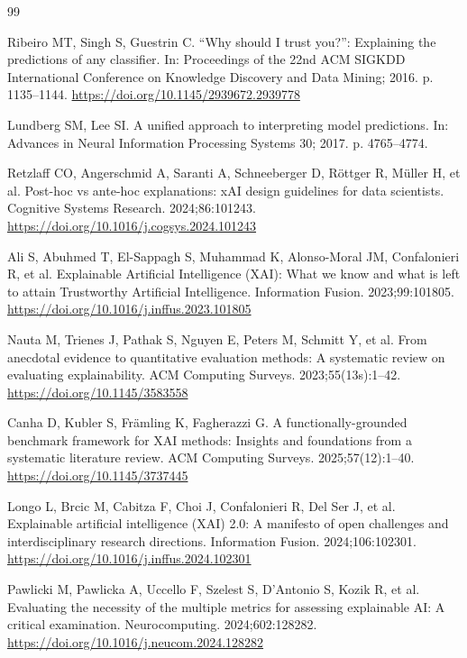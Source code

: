 \documentclass[11pt,a4paper]{article}
\begin{document}
\begin{thebibliography}{99}

Ribeiro MT, Singh S, Guestrin C. ``Why should I trust you?'': Explaining the
predictions of any classifier. In: Proceedings of the 22nd ACM SIGKDD
International Conference on Knowledge Discovery and Data Mining; 2016.
p. 1135--1144. \url{https://doi.org/10.1145/2939672.2939778}

Lundberg SM, Lee SI. A unified approach to interpreting model predictions.
In: Advances in Neural Information Processing Systems 30; 2017. p. 4765--4774.

Retzlaff CO, Angerschmid A, Saranti A, Schneeberger D, R\"{o}ttger R,
M\"{u}ller H, et al. Post-hoc vs ante-hoc explanations: xAI design guidelines
for data scientists. Cognitive Systems Research. 2024;86:101243.
\url{https://doi.org/10.1016/j.cogsys.2024.101243}

Ali S, Abuhmed T, El-Sappagh S, Muhammad K, Alonso-Moral JM, Confalonieri R,
et al. Explainable Artificial Intelligence (XAI): What we know and what is
left to attain Trustworthy Artificial Intelligence. Information Fusion.
2023;99:101805. \url{https://doi.org/10.1016/j.inffus.2023.101805}

Nauta M, Trienes J, Pathak S, Nguyen E, Peters M, Schmitt Y, et al. From
anecdotal evidence to quantitative evaluation methods: A systematic review on
evaluating explainability. ACM Computing Surveys. 2023;55(13s):1--42.
\url{https://doi.org/10.1145/3583558}

Canha D, Kubler S, Fr\"{a}mling K, Fagherazzi G. A functionally-grounded
benchmark framework for XAI methods: Insights and foundations from a
systematic literature review. ACM Computing Surveys. 2025;57(12):1--40.
\url{https://doi.org/10.1145/3737445}

Longo L, Brcic M, Cabitza F, Choi J, Confalonieri R, Del Ser J, et al.
Explainable artificial intelligence (XAI) 2.0: A manifesto of open challenges
and interdisciplinary research directions. Information Fusion.
2024;106:102301. \url{https://doi.org/10.1016/j.inffus.2024.102301}

Pawlicki M, Pawlicka A, Uccello F, Szelest S, D'Antonio S, Kozik R, et al.
Evaluating the necessity of the multiple metrics for assessing explainable
AI: A critical examination. Neurocomputing. 2024;602:128282.
\url{https://doi.org/10.1016/j.neucom.2024.128282}


\end{thebibliography}
\end{document}
